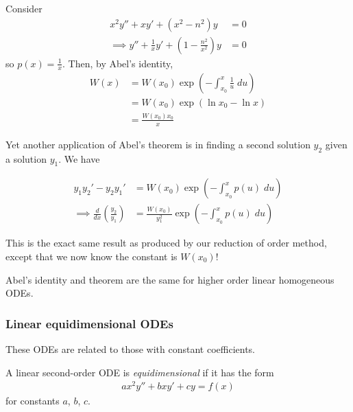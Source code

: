 \documentclass{../template/note}
\begin{document}
    \begin{example}
        Consider
        \begin{align*}
            x^2 y'' + xy' + (x^2-n^2)y &= 0 \\
            \implies y'' + \frac{1}{x}y' + \left(1- \frac{n^2}{x^2}\right)y &= 0
        \end{align*}
        so \(p(x) = \frac{1}{x}\). Then, by Abel's identity,
        \begin{align*}
            W(x) &= W(x_0) \exp\left(-\int_{x_0}^x \frac{1}{u} \; du\right) \\
            &= W(x_0) \exp(\ln x_0 - \ln x) \\
            &= \frac{W(x_0)x_0}{x}
        \end{align*}
    \end{example}
    
    Yet another application of Abel's theorem is in finding a second solution \(y_2\) given a solution \(y_1\). We have
    
    \begin{align*}
        y_1y_2' - y_2y_1' &= W(x_0) \exp\left(-\int_{x_0}^x p(u) \; du \right) \\
        \implies \frac{d}{dx} \left(\frac{y_2}{y_1}\right) &= \frac{W(x_0)}{y_1^2} \exp\left(-\int_{x_0}^x p(u) \; du \right)
    \end{align*}
    
    This is the exact same result as produced by our reduction of order method, except that we now know the constant is \(W(x_0)\)!

    \begin{remark*}
        Abel's identity and theorem are the same for higher order linear homogeneous ODEs.
    \end{remark*}

    \subsubsection{Linear equidimensional ODEs}

    These ODEs are related to those with constant coefficients.

    \begin{definition}
        A linear second-order ODE is \emph{equidimensional} if it has the form
        \begin{align*}
            ax^2y'' + bxy' + cy = f(x)
        \end{align*}
        for constants \(a\), \(b\), \(c\).
    \end{definition}
\end{document}
